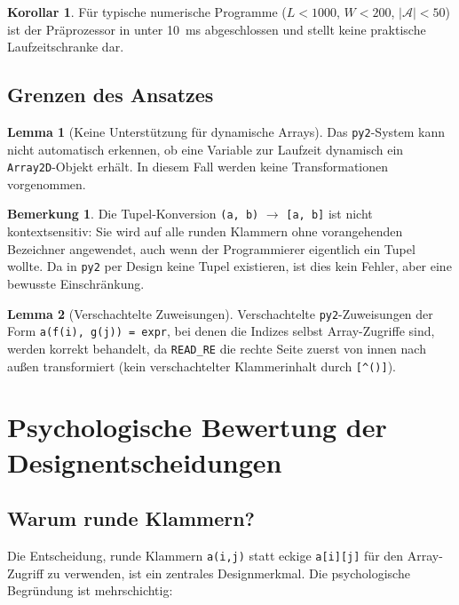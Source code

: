 \documentclass[a4paper,12pt]{article}
\theoremstyle{definition}
\newtheorem{lemma}{Lemma}
\newtheorem{bemerkung}{Bemerkung}
\newtheorem{korollar}{Korollar}
\begin{document}
\begin{korollar}
	F\"ur typische numerische Programme ($L < 1000$, $W < 200$, $|\mathcal{A}| < 50$)
	ist der Pr\"aprozessor in unter 10~ms abgeschlossen und stellt keine
	praktische Laufzeitschranke dar.
\end{korollar}

\subsection{Grenzen des Ansatzes}

\begin{lemma}[Keine Unterst\"utzung f\"ur dynamische Arrays]
	Das \texttt{py2}-System kann nicht automatisch erkennen, ob eine Variable
	zur Laufzeit dynamisch ein \texttt{Array2D}-Objekt erh\"alt. In diesem Fall
	werden keine Transformationen vorgenommen.
\end{lemma}

\begin{bemerkung}
	Die Tupel-Konversion \texttt{(a, b)} $\to$ \texttt{[a, b]} ist nicht kontextsensitiv:
	Sie wird auf alle runden Klammern ohne vorangehenden Bezeichner angewendet, auch wenn
	der Programmierer eigentlich ein Tupel wollte. Da in \texttt{py2} per Design keine
	Tupel existieren, ist dies kein Fehler, aber eine bewusste Einschr\"ankung.
\end{bemerkung}

\begin{lemma}[Verschachtelte Zuweisungen]
	Verschachtelte \texttt{py2}-Zuweisungen der Form
	\texttt{a(f(i), g(j)) = expr}, bei denen die Indizes selbst Array-Zugriffe sind,
	werden korrekt behandelt, da \texttt{READ\_RE} die rechte Seite zuerst von innen
	nach au\ss{}en transformiert (kein verschachtelter Klammerinhalt durch \texttt{[{\string^}()]}).
\end{lemma}

\section{Psychologische Bewertung der Designentscheidungen}

\subsection{Warum runde Klammern?}

Die Entscheidung, runde Klammern \texttt{a(i,j)} statt eckige \texttt{a[i][j]} f\"ur
den Array-Zugriff zu verwenden, ist ein zentrales Designmerkmal. Die psychologische
Begr\"undung ist mehrschichtig:
\end{document}
